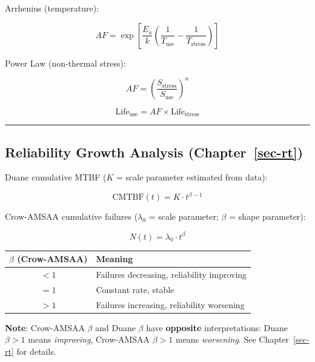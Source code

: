 \documentclass[
  letterpaper,
  DIV=11,
  numbers=noendperiod]{scrreprt}
\newcounter{none} %
\begin{document}
Arrhenius (temperature):

\[AF = \exp\!\left[\frac{E_a}{k}\left(\frac{1}{T_{\text{use}}} - \frac{1}{T_{\text{stress}}}\right)\right]\]

Power Law (non-thermal stress):

\[AF = \left(\frac{S_{\text{stress}}}{S_{\text{use}}}\right)^{n}\]

\[\text{Life}_{\text{use}} = AF \times \text{Life}_{\text{stress}}\]

\begin{center}\rule{0.5\linewidth}{0.5pt}\end{center}

\subsection*{\texorpdfstring{Reliability Growth Analysis
(Chapter~\ref{sec-rt})}{Reliability Growth Analysis (Chapter~)}}\label{reliability-growth-analysis-sec-rt}

Duane cumulative MTBF (\(K\) = scale parameter estimated from data):

\[\text{CMTBF}(t) = K \cdot t^{\beta - 1}\]

Crow-AMSAA cumulative failures (\(\lambda_0\) = scale parameter;
\(\beta\) = shape parameter):

\[N(t) = \lambda_0 \cdot t^{\beta}\]

{\def\LTcaptype{none} %
\begin{longtable}[]{@{}cl@{}}
\toprule\noalign{}
\(\beta\) (Crow-AMSAA) & Meaning \\
\midrule\noalign{}
\endhead
\bottomrule\noalign{}
\endlastfoot
\(< 1\) & Failures decreasing, reliability improving \\
\(= 1\) & Constant rate, stable \\
\(> 1\) & Failures increasing, reliability worsening \\
\end{longtable}
}

\begin{tcolorbox}[enhanced jigsaw, arc=.35mm, bottomrule=.15mm, bottomtitle=1mm, breakable, colback=white, colbacktitle=quarto-callout-warning-color!10!white, colframe=quarto-callout-warning-color-frame, coltitle=black, left=2mm, leftrule=.75mm, opacityback=0, opacitybacktitle=0.6, rightrule=.15mm, title=\textcolor{quarto-callout-warning-color}{\faExclamationTriangle}\hspace{0.5em}{Warning}, titlerule=0mm, toprule=.15mm, toptitle=1mm]

\textbf{Note}: Crow-AMSAA \(\beta\) and Duane \(\beta\) have
\textbf{opposite} interpretations: Duane \(\beta > 1\) means
\emph{improving}, Crow-AMSAA \(\beta > 1\) means \emph{worsening}. See
Chapter~\ref{sec-rt} for details.

\end{tcolorbox}
\end{document}
